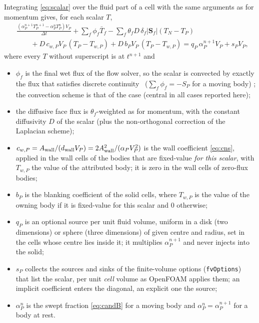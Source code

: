 \documentclass[11pt,a4paper]{article}
\theoremstyle{remark}
\newcommand{\Sf}{\bm{S}_f}
\newcommand{\dt}{\Delta t}
\newcommand{\Aw}{A_{\rm wall}}
\newcommand{\dw}{d_{\rm wall}}
\newcommand{\code}[1]{\texttt{#1}}
\begin{document}
Integrating \eqref{eq:scalar} over the fluid part of a cell with the same arguments as for
momentum gives, for each scalar $T$,
\begin{equation}
\begin{aligned}
&\frac{(\alpha^{n+1}_PT^{n+1}_P-\alpha^n_PT^n_P)V_P}{\dt}
+\sum_f\phi_f\bar T_f
-\sum_f\theta_fD\,\delta_f|\Sf|(T_N-T_P)\\
&\qquad+D\,c_{w,P}V_P\,(T_P-T_{w,P})+D\,b_PV_P\,(T_P-T_{w,P})
=q_P\,\alpha^{n+1}_PV_P+s_P V_P ,
\end{aligned}
\label{eq:scalard}
\end{equation}
where every $T$ without superscript is at $t^{n+1}$ and
\begin{itemize}\itemsep2pt
\item $\phi_f$ is the final wet flux of the flow solver, so the scalar is convected by exactly
      the flux that satisfies discrete continuity%
      \ ($\sum_f\phi_f=-S_P$ for a moving body)%
      ; the convection scheme is that of the case (central in all cases reported here);
\item the diffusive face flux is $\theta_f$-weighted as for momentum, with the constant
      diffusivity $D$ of the scalar (plus the non-orthogonal correction of the Laplacian
      scheme);
\item $c_{w,P}=\Aw/(\dw V_P)=2\Aw^2/(\alpha_PV_P^2)$ is the wall coefficient \eqref{eq:cns},
      applied in the wall cells of the bodies that are fixed-value \emph{for this scalar},
      with $T_{w,P}$ the value of the attributed body; it is zero in the wall cells of
      zero-flux bodies;
\item $b_P$ is the blanking coefficient of the solid cells, where $T_{w,P}$ is the value of the
      owning body if it is fixed-value for this scalar and $0$ otherwise;
\item $q_P$ is an optional source per unit fluid volume, uniform in a disk (two dimensions) or
      sphere (three dimensions) of given centre and radius, set in the cells whose centre lies
      inside it; it multiplies $\alpha^{n+1}_P$ and never injects into the solid;
\item $s_P$ collects the sources and sinks of the finite-volume options (\code{fvOptions})
      that list the scalar, per unit \emph{cell} volume as OpenFOAM applies them; an implicit
      coefficient enters the diagonal, an explicit one the source;
\item $\alpha^n_P$ is the swept fraction \eqref{eq:candB} for a moving body and
      $\alpha^n_P=\alpha^{n+1}_P$ for a body at rest.
\end{itemize}
\end{document}

